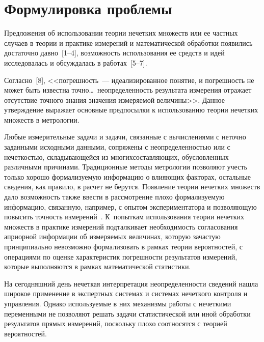       \begin{multicols}{2}

            \label{st\stat}

\section{Формулировка проблемы}
     
     Предложения об использовании теории нечетких множеств или ее 
частных случаев в теории и практике измерений и математической обработки 
появились достаточно давно~[1--4], возможность использования ее средств и 
идей исследовалась и обсуждалась в работах~[5--7].
  
  Согласно~[8], <<погрешность~--- идеализированное понятие, и погрешность 
не может быть известна точно\ldots\  неопределенность результата измерения 
отражает отсутствие точного знания значения измеряемой величины>>. Данное 
утверждение выражает основные предпосылки к использованию теории 
нечетких множеств в метрологии. 
  
  Любые измерительные задачи и задачи, связанные с вычислениями с неточно 
заданными исходными данными, сопряжены с неопределенностью или с 
нечеткостью, складывающейся из многих\linebreak со\-став\-ля\-ющих, обусловленных 
различными причинами. Традиционные методы метрологии позволяют учесть 
только хорошо формализуемую информацию о влияющих факторах, остальные 
сведения, как правило, в расчет не берутся. Появление тео\-рии нечетких 
множеств дало возможность также ввести в рассмотрение плохо 
формализуемую информацию, связанную, например, с опытом 
экспериментатора и позволяющую повысить точность измерений~\cite{5sem}. 
К~попыткам использования теории нечетких множеств в практике измерений 
подталкивает необходимость согласования априорной информации об 
измеряемых величинах, которую зачастую принципиально невозможно 
формализовать в рамках теории вероятностей, с операциями по оценке 
характеристик погрешности результатов измерений, которые выполняются в 
рамках математической статистики. 
  
  На сегодняшний день нечеткая интерпретация неопределенности сведений 
нашла широкое применение в экспертных системах и системах нечеткого 
контроля и управления. Однако используемые в них механизмы работы с 
нечеткими переменными не позволяют решать задачи статистической или иной 
обработки результатов прямых измерений, поскольку плохо соотносятся с 
теорией вероятностей.
  

\end{multicols}
